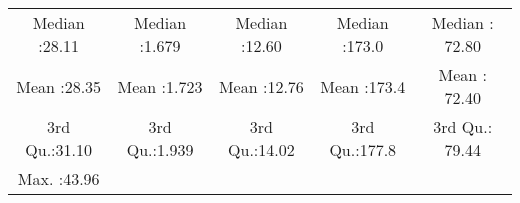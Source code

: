 \documentclass[
]{article}
\begin{document}
\begin{longtable}[]{@{}ccccc@{}}
\begin{minipage}[t]{0.17\columnwidth}
Median :28.11\strut
\end{minipage} & \begin{minipage}[t]{0.17\columnwidth}\centering
Median :1.679\strut
\end{minipage} & \begin{minipage}[t]{0.17\columnwidth}\centering
Median :12.60\strut
\end{minipage} & \begin{minipage}[t]{0.17\columnwidth}\centering
Median :173.0\strut
\end{minipage} & \begin{minipage}[t]{0.18\columnwidth}\centering
Median : 72.80\strut
\end{minipage}\tabularnewline
\begin{minipage}[t]{0.17\columnwidth}\centering
Mean :28.35\strut
\end{minipage} & \begin{minipage}[t]{0.17\columnwidth}\centering
Mean :1.723\strut
\end{minipage} & \begin{minipage}[t]{0.17\columnwidth}\centering
Mean :12.76\strut
\end{minipage} & \begin{minipage}[t]{0.17\columnwidth}\centering
Mean :173.4\strut
\end{minipage} & \begin{minipage}[t]{0.18\columnwidth}\centering
Mean : 72.40\strut
\end{minipage}\tabularnewline
\begin{minipage}[t]{0.17\columnwidth}\centering
3rd Qu.:31.10\strut
\end{minipage} & \begin{minipage}[t]{0.17\columnwidth}\centering
3rd Qu.:1.939\strut
\end{minipage} & \begin{minipage}[t]{0.17\columnwidth}\centering
3rd Qu.:14.02\strut
\end{minipage} & \begin{minipage}[t]{0.17\columnwidth}\centering
3rd Qu.:177.8\strut
\end{minipage} & \begin{minipage}[t]{0.18\columnwidth}\centering
3rd Qu.: 79.44\strut
\end{minipage}\tabularnewline
\begin{minipage}[t]{0.17\columnwidth}\centering
Max. :43.96\strut
\end{minipage} & \begin{minipage}[t]{0.17\columnwidth}\centering

\end{minipage}
\end{longtable}
\end{document}
